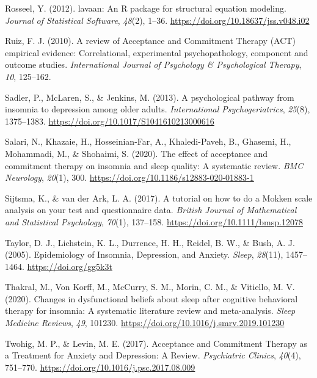 \documentclass[
  ,doc,11pt, twoside,floatsintext]{apa6}
\newlength{\cslhangindent}
\newlength{\cslentryspacingunit} %
\newenvironment{CSLReferences}[2] %
 {%
  \setlength{\parindent}{0pt}
  \ifodd #1
  \let\oldpar\par
  \def\par{\hangindent=\cslhangindent\oldpar}
  \fi
  \setlength{\parskip}{#2\cslentryspacingunit}
 }%
 {}
\begin{document}
\begin{CSLReferences}{1}{0}
\leavevmode{}%
Rosseel, Y. (2012). {lavaan}: An {R} package for structural equation modeling. \emph{Journal of Statistical Software}, \emph{48}(2), 1--36. \url{https://doi.org/10.18637/jss.v048.i02}

\leavevmode{}%
Ruiz, F. J. (2010). A review of {Acceptance} and {Commitment Therapy} ({ACT}) empirical evidence: {Correlational}, experimental psychopathology, component and outcome studies. \emph{International Journal of Psychology \& Psychological Therapy}, \emph{10}, 125--162.

\leavevmode{}%
Sadler, P., McLaren, S., \& Jenkins, M. (2013). A psychological pathway from insomnia to depression among older adults. \emph{International Psychogeriatrics}, \emph{25}(8), 1375--1383. \url{https://doi.org/10.1017/S1041610213000616}

\leavevmode{}%
Salari, N., Khazaie, H., Hosseinian-Far, A., Khaledi-Paveh, B., Ghasemi, H., Mohammadi, M., \& Shohaimi, S. (2020). The effect of acceptance and commitment therapy on insomnia and sleep quality: {A} systematic review. \emph{BMC Neurology}, \emph{20}(1), 300. \url{https://doi.org/10.1186/s12883-020-01883-1}

\leavevmode{}%
Sijtsma, K., \& van der Ark, L. A. (2017). A tutorial on how to do a {Mokken} scale analysis on your test and questionnaire data. \emph{British Journal of Mathematical and Statistical Psychology}, \emph{70}(1), 137--158. \url{https://doi.org/10.1111/bmsp.12078}

\leavevmode{}%
Taylor, D. J., Lichstein, K. L., Durrence, H. H., Reidel, B. W., \& Bush, A. J. (2005). Epidemiology of {Insomnia}, {Depression}, and {Anxiety}. \emph{Sleep}, \emph{28}(11), 1457--1464. \url{https://doi.org/gg5k3t}

\leavevmode{}%
Thakral, M., Von Korff, M., McCurry, S. M., Morin, C. M., \& Vitiello, M. V. (2020). Changes in dysfunctional beliefs about sleep after cognitive behavioral therapy for insomnia: {A} systematic literature review and meta-analysis. \emph{Sleep Medicine Reviews}, \emph{49}, 101230. \url{https://doi.org/10.1016/j.smrv.2019.101230}

\leavevmode{}%
Twohig, M. P., \& Levin, M. E. (2017). Acceptance and {Commitment Therapy} as a {Treatment} for {Anxiety} and {Depression}: {A Review}. \emph{Psychiatric Clinics}, \emph{40}(4), 751--770. \url{https://doi.org/10.1016/j.psc.2017.08.009}


\end{CSLReferences}
\end{document}
